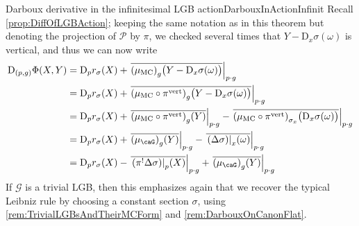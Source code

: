 \documentclass[reqno,a4paper,oneside]{amsart}
\newcommand\mutot{\mu_\caG}
\newcommand\MC{\mu_{{\rm MC}}}
\theoremstyle{plain}
\theoremstyle{remark}
\theoremstyle{definition}
\begin{document}
\begin{remarks}{Darboux derivative in the infinitesimal LGB action}{DarbouxInActionInfinit}
Recall \ref{prop:DiffOfLGBAction}; keeping the same notation as in this theorem but denoting the projection of $\mathcal{P}$ by $\pi$, we checked several times that $Y - \mathrm{D}_{x}\sigma (\omega)$ is vertical, and thus we can now write
\begin{align*}
\mathrm{D}_{(p, g)}\Phi(X, Y)
&=
\mathrm{D}_pr_\sigma(X)
	+ \mleft.{\overline{\mleft( \MC\mright)_{g} \bigl(Y - \mathrm{D}_{x}\sigma (\omega)\bigr)}}\mright|_{p \cdot g}
\\
&=
\mathrm{D}_pr_\sigma(X)
	+ \mleft.{\overline{\mleft( \MC \circ \pi^{\mathrm{vert}}\mright)_{g} \bigl(Y - \mathrm{D}_{x}\sigma (\omega)\bigr)}}\mright|_{p \cdot g}
\\
&=
\mathrm{D}_pr_\sigma(X)
	+ \mleft.{\overline{\mleft( \MC \circ \pi^{\mathrm{vert}}\mright)_{g} (Y)}}\mright|_{p \cdot g}
	- \mleft.{\overline{\mleft( \MC \circ \pi^{\mathrm{vert}}\mright)_{\sigma_x} \bigl( \mathrm{D}_{x}\sigma (\omega)\bigr)}}\mright|_{p \cdot g}
\\
&=
\mathrm{D}_pr_\sigma(X)
	+ \mleft.{\overline{\mleft( \mutot\mright)_{g} (Y)}}\mright|_{p \cdot g}
	- \mleft.{\overline{ \mleft.(\Delta \sigma)\mright|_x (\omega)}}\mright|_{p \cdot g}
\\
&=
\mathrm{D}_pr_\sigma(X)
	- \mleft.{\overline{ \mleft.\mleft(\pi^!\Delta \sigma\mright)\mright|_p (X)}}\mright|_{p \cdot g}
	+ \mleft.{\overline{\mleft( \mutot\mright)_{g} (Y)}}\mright|_{p \cdot g}
\end{align*}
If $\mathcal{G}$ is a trivial LGB, then this emphasizes again that we recover the typical Leibniz rule by choosing a constant section $\sigma$, using \ref{rem:TrivialLGBsAndTheirMCForm} and \ref{rem:DarbouxOnCanonFlat}.
\end{remarks}
\end{document}
